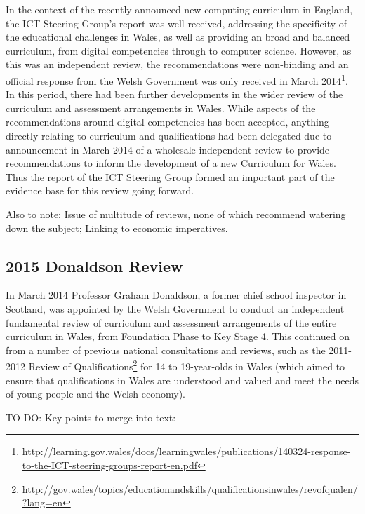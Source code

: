 \documentclass{sig-alternate}
\begin{document}
In the context of the recently announced new computing curriculum in
England, the ICT Steering Group's report was well-received, addressing
the specificity of the educational challenges in Wales, as well as
providing an broad and balanced curriculum, from digital competencies
through to computer science. However, as this was an independent
review, the recommendations were non-binding and an official response
from the Welsh Government was only received in March
2014\footnote{\url{http://learning.gov.wales/docs/learningwales/publications/140324-response-to-the-ICT-steering-groups-report-en.pdf}}. In
this period, there had been further developments in the wider review
of the curriculum and assessment arrangements in Wales. While aspects
of the recommendations around digital competencies has been accepted,
anything directly relating to curriculum and qualifications had been
delegated due to announcement in March 2014 of a wholesale independent
review to provide recommendations to inform the development of a new
Curriculum for Wales. Thus the report of the ICT Steering Group formed
an important part of the evidence base for this review going forward.

Also to note: Issue of multitude of reviews, none of which recommend watering down
the subject; Linking to economic imperatives.

\subsection{2015 Donaldson Review}


In March 2014 Professor Graham Donaldson, a former chief school
inspector in Scotland, was appointed by the Welsh Government to
conduct an independent fundamental review of curriculum and assessment
arrangements of the entire curriculum in Wales, from Foundation Phase
to Key Stage 4. This continued on from a number of previous national
consultations and reviews, such as the 2011-2012 Review of
Qualifications\footnote{\url{http://gov.wales/topics/educationandskills/qualificationsinwales/revofqualen/?lang=en}}
for 14 to 19-year-olds in Wales (which aimed to ensure that
qualifications in Wales are understood and valued and meet the needs of
young people and the Welsh economy).

TO DO: Key points to merge into text:
\end{document}
